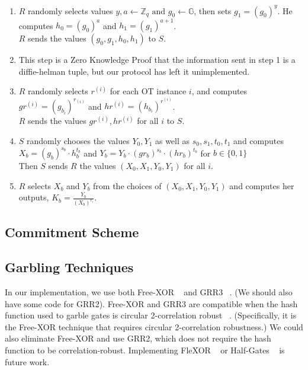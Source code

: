 \documentclass{article}
\begin{document}
\begin{enumerate}
	\item $R$ randomly selects values $y,a \leftarrow \mathbb{Z}_{q} \text{ and } g_{0} \leftarrow \mathbb{G}$, then sets $g_{1}=(g_{0})^{y}$. He computes $h_{0} = (g_{0})^{a}$ and $h_{1} = (g_{1})^{a + 1}$. \\
	$R$ sends the values $(g_{0},g_{1},h_{0}, h_{1})$ to $S$.
	\item This step is a Zero Knowledge Proof that the information sent in step 1 is a diffie-helman tuple, but our protocol has left it unimplemented.
	\item $R$ randomly selects $r^{(i)}$ for each OT instance $i$, and computes $gr^{(i)} = (g_{b_i})^{r_{(i)}}$ and $hr^{(i)}= (h_{b_{i}})^{r^{(i)}}$. \\
	 $R$ sends the values $gr^{(i)}, hr^{(i)}$ for all $i$ to $S$. 
	\item $S$ randomly chooses the values $Y_{0},Y_{1}$ as well as $s_{0},s_{1},t_{0},t_{1}$ and computes $X_{b} = (g_{b})^{s_{b}} \cdot h_{b}^{t_{b}}$ and $Y_{b} = Y_{b} \cdot (gr_{b})^{s_{b}} \cdot (hr_{b})^{t_{b}}$ for $b \in \{0,1\}$\\
	Then $S$ sends $R$ the values $(X_{0},X_{1},Y_{0},Y_{1})$ for all $i$.
	\item $R$ selects $X_{b}$ and $Y_{b}$ from the choices of $(X_{0},X_{1},Y_{0},Y_{1})$ and computes her outputs, $K_{b} = \frac{Y_{b}}{(X_{b})^{r_i}}$.
\end{enumerate}


\subsection{Commitment Scheme} \label{comm-scheme}



\subsection{Garbling Techniques}
In our implementation, we use both Free-XOR ~\cite{freeXOR} and GRR3 ~\cite{GRR}. (We should also have some code for GRR2). Free-XOR and GRR3 are compatible when the hash function used to garble gates is circular 2-correlation robust ~\cite{GRR, freeXOR-security}. (Specifically, it is the Free-XOR technique that requires circular 2-correlation robustness.) We could also eliminate Free-XOR and use GRR2, which does not require the hash function to be correlation-robust. Implementing FleXOR ~\cite{flexor} or Half-Gates ~\cite{half-gates} is future work.
\end{document}
